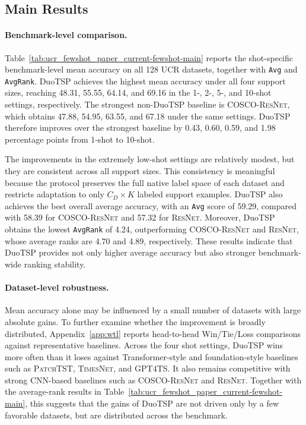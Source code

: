 \documentclass{article}
\begin{document}
\subsection{Main Results}

\paragraph{Benchmark-level comparison.}
Table~\ref{tab:ucr_fewshot_paper_current-fewshot-main} reports the shot-specific benchmark-level mean accuracy on all 128 UCR datasets, together with \texttt{Avg} and \texttt{AvgRank}.
DuoTSP achieves the highest mean accuracy under all four support sizes, reaching 48.31, 55.55, 64.14, and 69.16 in the 1-, 2-, 5-, and 10-shot settings, respectively.
The strongest non-DuoTSP baseline is \textsc{COSCO-ResNet}, which obtains 47.88, 54.95, 63.55, and 67.18 under the same settings.
DuoTSP therefore improves over the strongest baseline by 0.43, 0.60, 0.59, and 1.98 percentage points from 1-shot to 10-shot.

The improvements in the extremely low-shot settings are relatively modest, but they are consistent across all support sizes.
This consistency is meaningful because the protocol preserves the full native label space of each dataset and restricts adaptation to only $C_D \times K$ labeled support examples.
DuoTSP also achieves the best overall average accuracy, with an \texttt{Avg} score of 59.29, compared with 58.39 for \textsc{COSCO-ResNet} and 57.32 for \textsc{ResNet}.
Moreover, DuoTSP obtains the lowest \texttt{AvgRank} of 4.24, outperforming \textsc{COSCO-ResNet} and \textsc{ResNet}, whose average ranks are 4.70 and 4.89, respectively.
These results indicate that DuoTSP provides not only higher average accuracy but also stronger benchmark-wide ranking stability.



\paragraph{Dataset-level robustness.}
Mean accuracy alone may be influenced by a small number of datasets with large absolute gains.
To further examine whether the improvement is broadly distributed, Appendix~\ref{app:wtl} reports head-to-head Win/Tie/Loss comparisons against representative baselines.
Across the four shot settings, DuoTSP wins more often than it loses against Transformer-style and foundation-style baselines such as \textsc{PatchTST}, \textsc{TimesNet}, and \textsc{GPT4TS}.
It also remains competitive with strong CNN-based baselines such as \textsc{COSCO-ResNet} and \textsc{ResNet}.
Together with the average-rank results in Table~\ref{tab:ucr_fewshot_paper_current-fewshot-main}, this suggests that the gains of DuoTSP are not driven only by a few favorable datasets, but are distributed across the benchmark.
\end{document}
